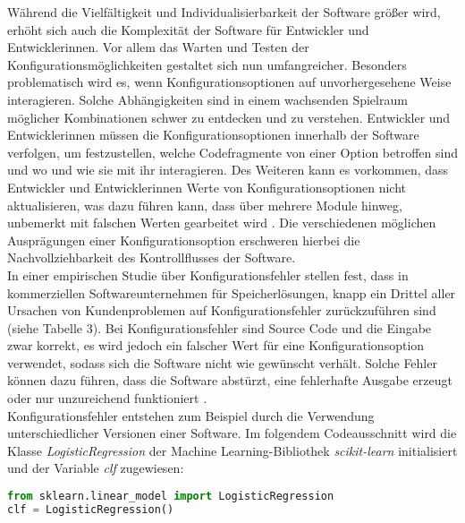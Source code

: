 \documentclass[german,bachelor]{swsLeipzig}
\begin{document}
W\"ahrend die Vielf\"altigkeit und Individualisierbarkeit der Software gr\"o\ss er wird, erh\"oht sich auch die Komplexit\"at der Software f\"ur Entwickler und Entwicklerinnen.
Vor allem das Warten und Testen der Konfigurationsmöglichkeiten gestaltet sich nun umfangreicher.
Besonders problematisch wird es, wenn Konfigurationsoptionen auf unvorhergesehene Weise interagieren.
Solche Abh\"angigkeiten sind in einem wachsenden Spielraum m\"oglicher Kombinationen schwer zu entdecken und zu verstehen.
Entwickler und Entwicklerinnen m\"ussen die Konfigurationsoptionen innerhalb der Software verfolgen, um festzustellen,
welche Codefragmente von einer Option betroffen sind und wo und wie sie mit ihr interagieren.
Des Weiteren kann es vorkommen, dass Entwickler und Entwicklerinnen Werte von Konfigurationsoptionen nicht aktualisieren, was dazu führen kann,
dass über mehrere Module hinweg, unbemerkt mit falschen Werten gearbeitet wird \cite[]{7774519}.
Die verschiedenen m\"oglichen Auspr\"agungen einer Konfigurationsoption erschweren hierbei die Nachvollziehbarkeit des Kontrollflusses der Software.\\

In einer empirischen Studie über Konfigurationsfehler stellen \citeauthor{10.1145/2043556.2043572} fest,
dass in kommerziellen Softwareunternehmen für Speicherlösungen, knapp ein Drittel aller Ursachen von Kundenproblemen auf Konfigurationsfehler zurückzuführen sind (siehe Tabelle 3).
Bei Konfigurationsfehler sind Source Code und die Eingabe zwar korrekt, es wird jedoch ein falscher Wert für eine Konfigurationsoption verwendet,
sodass sich die Software nicht wie gewünscht verhält.
Solche Fehler können dazu führen, dass die Software abstürzt, eine fehlerhafte Ausgabe erzeugt oder nur unzureichend funktioniert \cite[]{10.1145/2568225.2568251}.\\

Konfigurationsfehler entstehen zum Beispiel durch die Verwendung unterschiedlicher Versionen einer Software.
Im folgendem Codeausschnitt wird die Klasse \textit{LogisticRegression} der Machine Learning-Bibliothek \textit{scikit-learn} initialisiert und der Variable \textit{clf} zugewiesen:\\

\noindent\begin{minipage}{\linewidth}
\begin{lstlisting}[language=Python, frame=single, basicstyle=\small, caption={Nutzung der LogisticRegression-Klasse aus scikit-learn},captionpos=b]
from sklearn.linear_model import LogisticRegression
clf = LogisticRegression()
\end{lstlisting}
\end{minipage}
\
\end{document}
